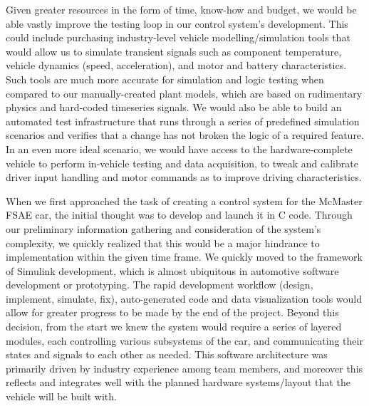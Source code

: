 \documentclass[12pt, titlepage]{article}
\begin{document}
  Given greater resources in the form of time, know-how and budget, we would be able vastly improve the testing loop in our control system's development. This could include purchasing industry-level vehicle modelling/simulation tools that would allow us to simulate transient signals such as component temperature, vehicle dynamics (speed, acceleration), and motor and battery characteristics. Such tools are much more accurate for simulation and logic testing when compared to our manually-created plant models, which are based on rudimentary physics and hard-coded timeseries signals. We would also be able to build an automated test infrastructure that runs through a series of predefined simulation scenarios and verifies that a change has not broken the logic of a required feature. In an even more ideal scenario, we would have access to the hardware-complete vehicle to perform in-vehicle testing and data acquisition, to tweak and calibrate driver input handling and motor commands as to improve driving characteristics.


When we first approached the task of creating a control system for the McMaster FSAE car, the initial thought was to develop and launch it in C code. Through our preliminary information gathering and consideration of the system's complexity, we quickly realized that this would be a major hindrance to implementation within the given time frame. We quickly moved to the framework of Simulink development, which is almost ubiquitous in automotive software development or prototyping. The rapid development workflow (design, implement, simulate, fix), auto-generated code and data visualization tools would allow for greater progress to be made by the end of the project. 
Beyond this decision, from the start we knew the system would require a series of layered modules, each controlling various subsystems of the car, and communicating their states and signals to each other as needed. This software architecture was primarily driven by industry experience among team members, and moreover this reflects and integrates well with the planned hardware systems/layout that the vehicle will be built with.
  
\end{document}
